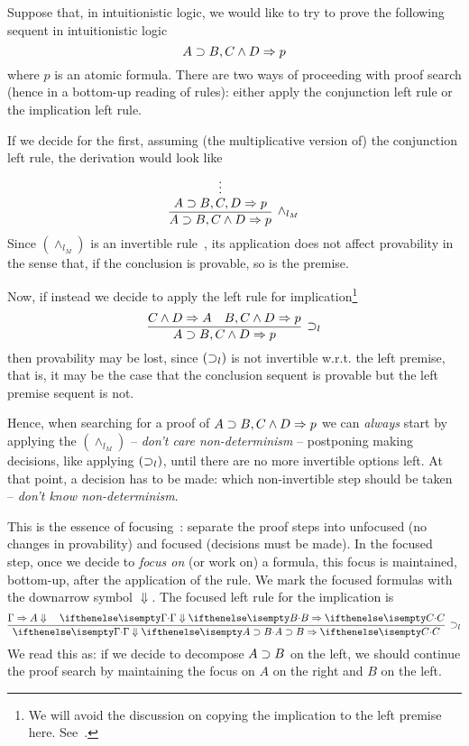 
Suppose that, in intuitionistic logic, we would like to try to prove the following sequent in intuitionistic logic
\[
A\supset B, C\wedge D\Rightarrow p
\]
where $p$ is an atomic formula. There are two ways of proceeding with proof search (hence in a bottom-up reading of rules): either apply the conjunction left rule or the implication left rule.

If we decide for the first, assuming (the multiplicative version of) the conjunction left rule, the derivation would look like
\[
\infer[\wedge_{l_M}]{A\iimp B, C\wedge D\seq p}
{\deduce{A\iimp B, C, D\seq p}{
\deduce{}{\vdots}}}
\] 
Since $(\wedge_{l_M})$ is an invertible rule~\cite{troelstra00book}, its application does not affect provability in the sense that, if the conclusion is provable, so is the premise.

Now, if instead we decide to apply the left rule for implication\footnote{We will avoid the discussion on copying the  implication to the left premise here. See~\cite{DBLP:journals/jsyml/Dyckhoff92}.}
\[
\infer[\iimp_{l}]{A\iimp B, C\wedge D\seq p}{C\wedge D\seq A & B, C\wedge D\seq p}
\] 
then provability may be lost, since $(\supset_{l})$ is not invertible w.r.t. the left premise, that is, it may be the case that the conclusion sequent is provable but the left premise sequent is not.

Hence, when  searching for a proof of $A\supset B, C\wedge D\Rightarrow p$ we can {\em always} start by applying the $(\wedge_{l_M})$ --  {\em don't care non-determinism} -- postponing making decisions, like applying $(\supset_{l})$, until there are no more invertible options left. At that point, a decision has to be made: which non-invertible step should be taken --  {\em don't know non-determinism}. 

This is the essence of focusing~\cite{andreoli92jlc}: separate the proof steps into unfocused (no changes in provability) and focused (decisions must be made). In the focused step, once we decide to {\em focus on} (or work on) a formula, this focus is maintained, bottom-up, after the application of the rule. We mark the focused formulas with the downarrow symbol $\Downarrow$. The focused left rule for the implication is
\[
\infer[\iimp_{l}]{\jLf{\Gamma}{A\iimp B}{C}}{\jRf{\Gamma}{A}{} & \jLf{\Gamma}{B}{C}}
\] 
We read this as: if we decide to decompose $A\supset B$ on the left, we should continue the proof search by maintaining the focus  on $A$ on the right and $B$ on the left.

